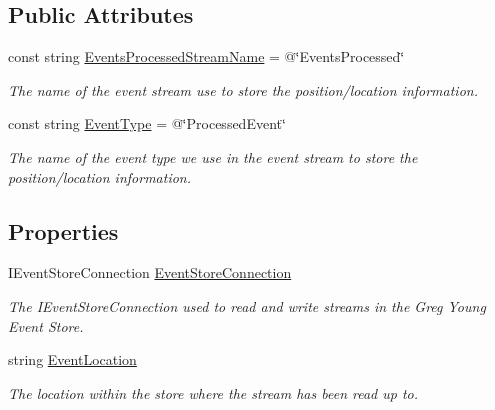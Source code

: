 \subsection*{Public Attributes}
\begin{DoxyCompactItemize}
\item 
const string \hyperlink{classCqrs_1_1EventStore_1_1Bus_1_1EventStoreBasedLastEventProcessedStore_aa3125d75a64df58026e0fd785f99bfff_aa3125d75a64df58026e0fd785f99bfff}{Events\+Processed\+Stream\+Name} = @\char`\"{}Events\+Processed\char`\"{}
\begin{DoxyCompactList}\small\item\em The name of the event stream use to store the position/location information. \end{DoxyCompactList}\item 
const string \hyperlink{classCqrs_1_1EventStore_1_1Bus_1_1EventStoreBasedLastEventProcessedStore_a63b4ae4f14e782d605aff1bd214db3f1_a63b4ae4f14e782d605aff1bd214db3f1}{Event\+Type} = @\char`\"{}Processed\+Event\char`\"{}
\begin{DoxyCompactList}\small\item\em The name of the event type we use in the event stream to store the position/location information. \end{DoxyCompactList}\end{DoxyCompactItemize}
\subsection*{Properties}
\begin{DoxyCompactItemize}
\item 
I\+Event\+Store\+Connection \hyperlink{classCqrs_1_1EventStore_1_1Bus_1_1EventStoreBasedLastEventProcessedStore_acce685c2420cae5df4291fea96e20e64_acce685c2420cae5df4291fea96e20e64}{Event\+Store\+Connection}
\begin{DoxyCompactList}\small\item\em The I\+Event\+Store\+Connection used to read and write streams in the Greg Young Event Store. \end{DoxyCompactList}\item 
string \hyperlink{classCqrs_1_1EventStore_1_1Bus_1_1EventStoreBasedLastEventProcessedStore_a3f4ac10a5ede43130099f2d1b421ea1c_a3f4ac10a5ede43130099f2d1b421ea1c}{Event\+Location}
\begin{DoxyCompactList}\small\item\em The location within the store where the stream has been read up to. \end{DoxyCompactList}\end{DoxyCompactItemize}


